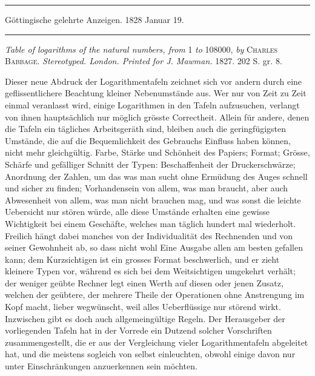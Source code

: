 \clearpage{}
\par{}\begin{center}\rule{0.7\linewidth}{0.4pt}\par Göttingische gelehrte Anzeigen. 1828 Januar 19.\par\rule{0.7\linewidth}{0.4pt}\end{center}

\noindent\textit{Table of logarithms of the natural numbers, from} 1 \textit{to} 108000, \textit{by} \textsc{Charles}
\textsc{Babbage.} \textit{Stereotyped. London. Printed for J. Mawman.} 1827. 202 S. gr. 8.

Dieser neue Abdruck der Logarithmentafeln zeichnet sich vor andern durch
eine geflissentlichere Beachtung kleiner Nebenumstände aus. Wer nur von Zeit
zu Zeit einmal veranlasst wird, einige Logarithmen in den Tafeln aufzusuchen,
verlangt von ihnen hauptsächlich nur möglich grösste Correctheit. Allein für andere, denen die Tafeln ein tägliches Arbeitsgeräth sind, bleiben auch die geringfügigsten Umstände, die auf die Bequemlichkeit des Gebrauchs Einfluss haben
können, nicht mehr gleichgültig. Farbe, Stärke und Schönheit des Papiers;
Format; Grösse, Schärfe und gefälliger Schnitt der Typen: Beschaffenheit der
Druckerschwärze; Anordnung der Zahlen, um das was man sucht ohne Ermüdung des Auges schnell und sicher zu finden; Vorhandensein von allem, was man
braucht, aber auch Abwesenheit von allem, was man nicht brauchen mag, und
was sonst die leichte Uebersicht nur stören würde, alle diese Umstände erhalten
eine gewisse Wichtigkeit bei einem Geschäfte, welches man täglich hundert mal
wiederholt. Freilich hängt dabei manches von der Individualität des Rechnenden
und von seiner Gewohnheit ab, so dass nicht wohl Eine Ausgabe allen am besten
gefallen kann; dem Kurzsichtigen ist ein grosses Format beschwerlich, und er
zieht kleinere Typen vor, während es sich bei dem Weitsichtigen umgekehrt verhält; der weniger geübte Rechner legt einen Werth auf diesen oder jenen Zusatz,
welchen der geübtere, der mehrere Theile der Operationen ohne Anstrengung im
Kopf macht, lieber wegwünscht, weil alles Ueberflüssige nur störend wirkt. Inzwischen gibt es doch auch allgemeingültige Regeln. Der Herausgeber der vorliegenden Tafeln hat in der Vorrede ein Dutzend solcher Vorschriften zusammengestellt, die er aus der Vergleichung vieler Logarithmentafeln abgeleitet hat, und
die meistens sogleich von selbst einleuchten, obwohl einige davon nur unter Einschränkungen anzuerkennen sein möchten.

